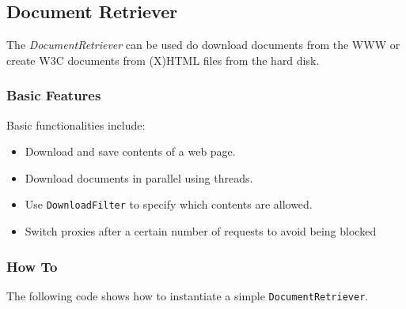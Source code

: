 \subsection{Document Retriever}
The \emph{DocumentRetriever} can be used do download documents from the WWW or create W3C documents from (X)HTML files from the hard disk. 

\subsubsection{Basic Features}
Basic functionalities include:
\begin{itemize}
\item Download and save contents of a web page.
\item Download documents in parallel using threads.
\item Use \verb#DownloadFilter# to specify which contents are allowed.
\item Switch proxies after a certain number of requests to avoid being blocked
\end{itemize}

\subsubsection{How To}
The following code shows how to instantiate a simple \verb#DocumentRetriever#.


